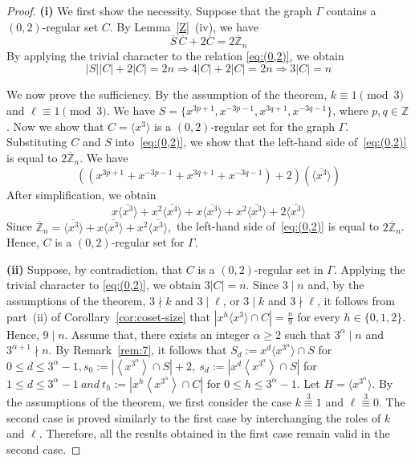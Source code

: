 \documentclass[12pt]{article}
\begin{document}
\begin{proof}
 \textbf{(i)} We first show the necessity. Suppose that the graph $\Gamma$ contains a $(0,2)$-regular set $C$. By Lemma~\ref{Z}~(iv), we have
\begin{equation}\label{eq:(0,2)}
	\overline{S}\,\overline{C}+2\overline{C}
	=2\overline{\mathbb{Z}}_{n}
\end{equation}
By applying the trivial character to the relation \eqref{eq:(0,2)}, we obtain
\[
|S||C|+2|C|=2n \Longrightarrow
4|C|+2|C|=2n \Longrightarrow 3|C|=n
\]

We now prove the sufficiency. By the assumption of the theorem,
\(k\equiv 1 \pmod{3}\) and \(\ell\equiv 1 \pmod{3}\). We have $S=\{x^{3p+1},x^{-3p-1},x^{3q+1},x^{-3q-1}\}$, where \(p,q\in\mathbb{Z}\).
Now we show that
$C=\langle x^{3}\rangle$
is a $(0,2)$-regular set for the graph $\Gamma$.
Substituting $C$ and $S$ into~\eqref{eq:(0,2)}, we show that the left-hand side of~\eqref{eq:(0,2)} is equal to $2\overline{\mathbb{Z}}_{n}$. We have
\[
\left(\left(x^{3p+1}+x^{-3p-1}+x^{3q+1}+x^{-3q-1}\right)+2\right)
\left(\overline{\langle x^{3}\rangle}\right)
\]
After simplification, we obtain
\[
x\overline{\langle x^{3}\rangle}
+x^{2}\overline{\langle x^{4}\rangle}
+x\overline{\langle x^{3}\rangle}
+x^2\overline{\langle x^{3}\rangle}
+2\overline{\langle x^{3}\rangle}
\]
Since
$
\overline{\mathbb{Z}}_{n}
=
\overline{\langle x^{3}\rangle}
+x\overline{\langle x^{3}\rangle}
+x^{2}\overline{\langle x^{3}\rangle},
$
the left-hand side of~\eqref{eq:(0,2)} is equal to
$2\overline{\mathbb{Z}}_{n}$.
Hence, $C$ is a $(0,2)$-regular set for $\Gamma$.	
	
\textbf{(ii)}  Suppose, by contradiction, that \(C\) is a \((0,2)\)-regular set in \(\Gamma\). Applying the trivial character to \eqref{eq:(0,2)}, we obtain \(3|C|=n\). Since \(3\mid n\) and, by the assumptions of the theorem, $3\nmid k$ and $3\mid \ell$, or $3\mid k$ and $3\nmid \ell$, it follows from part~(ii) of Corollary~\ref{cor:coset-size} that \(\left|x^{h}\langle x^{3}\rangle\cap C\right|=\frac{n}{9}\) for every \(h\in\{0,1,2\}\). Hence, \(9\mid n\). Assume that, there exists an integer \(\alpha\ge 2\) such that
$
3^{\alpha}\mid n$
and
$3^{\alpha+1}\nmid n.$ By Remark~\ref{rem:7}, it follows that $ S_d := x^d \langle x^{3^{\alpha}} \rangle \cap S$ for $0 \le d \le 3^{\alpha}-1, s_0:=\left|\left\langle x^{3^{\alpha}}\right\rangle\cap S\right|+2,\ 	s_d:=\left|x^d\left\langle x^{3^{\alpha}}\right\rangle\cap S\right|$ for $1\le d\le 3^{\alpha}-1\ and\ t_h:=\left|x^h\left\langle x^{3^{\alpha}}\right\rangle\cap C\right|$ for $0\le h\le 3^{\alpha}-1.$ Let
$
H=\langle x^{3^{\alpha}}\rangle.
$ By the assumptions of the theorem, we first consider the case \(k \stackrel{3}{\equiv} 1\) and \(\ell \stackrel{3}{\equiv} 0\). The second case is proved similarly to the first case by interchanging the roles of \(k\) and \(\ell\). Therefore, all the results obtained in the first case remain valid in the second case.


\end{proof}
\end{document}
